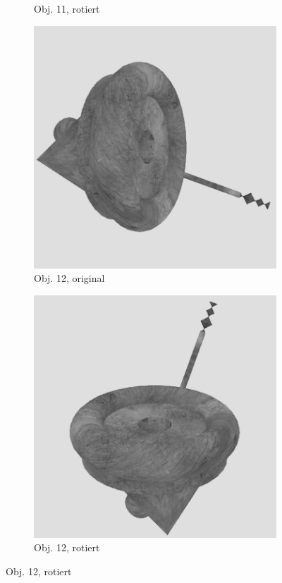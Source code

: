 \begin{figure}
\begin{subfigure}{0.2\textwidth}
\caption{Obj. 11, rotiert} \label{fig:d}
\end{subfigure} \hspace{.5cm}%
\begin{subfigure}{0.2\textwidth}
\includegraphics[width=\linewidth]{Bilder/Objekt12A.png}
\caption{Obj. 12, original} \label{fig:e}
\end{subfigure}\hspace{.5cm}
\begin{subfigure}{0.2\textwidth}
\includegraphics[width=\linewidth]{Bilder/Objekt12B.png}
\caption{Obj. 12, rotiert} \label{fig:f}
\end{subfigure}\hspace{.5cm}


\end{figure}
